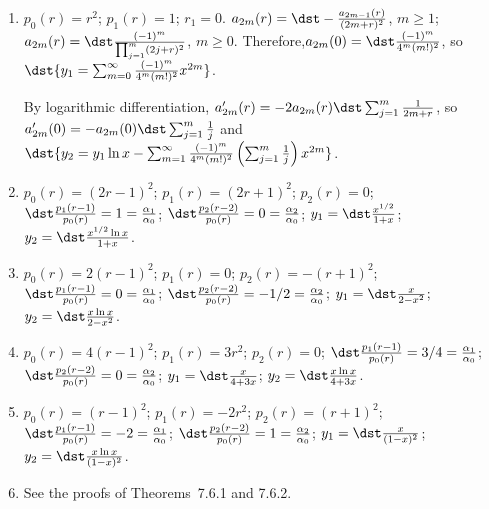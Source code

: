 \documentclass[openany]{book}
\newenvironment{sectionSolutions}{
 \begin{enumerate}[item-label={\thesection.\arabic{enumi}.}]
}{
 \end{enumerate}
}
\begin{document}
\begin{sectionSolutions}

\item
$p_0(r)=r^2$; $p_1(r)=1$; $r_1=0$.
$a_{2m}(r)=\dst-\frac{a_{2m-1}(r)}{(2m+r)^2}$, $m\ge1$;
$a_{2m}(r)=\dst\frac{(-1)^m}{\prod_{j=1}^m(2j+r)^2}$,  $m\ge0$.
Therefore,$a_{2m}(0)=\dst\frac{(-1)^m}{4^m(m!)^2}$, so
$\dst{y_1=\sum_{m=0}^\infty\frac{(-1)^m}{4^m(m!)^2}x^{2m}}$.

By logarithmic differentiation, $a_{2m}'(r)=-2a_{2m}(r)\dst
\sum_{j=1}^m\frac{1}{2m+r}$, so
 $a_{2m}'(0)=-a_{2m}(0)\dst\sum_{j=1}^m\frac{1}{ j}$ and
$\dst{y_2=y_1\ln x-
\sum_{m=1}^\infty\frac{(-1)^m}{4^m(m!)^2}
\left(\sum_{j=1}^m\frac{1}{ j}\right)x^{2m}}$.


\item
$p_0(r)=(2r-1)^2$;
$p_1(r)=(2r+1)^2$;
$p_2(r)=0$;
$\dst\frac{p_1(r-1)}{ p_0(r)}=1=\frac{\alpha_1}{\alpha_0}$;
$\dst\frac{p_2(r-2)}{ p_0(r)}=0=\frac{\alpha_2}{\alpha_0}$;
$y_1=\dst\frac{x^{1/2}}{1+x}$; $y_2=\dst\frac{x^{1/2}\ln x}{1+x}$.

\item
$p_0(r)=2(r-1)^2$;
$p_1(r)=0$;
$p_2(r)=-(r+1)^2$;
$\dst\frac{p_1(r-1)}{ p_0(r)}=0=\frac{\alpha_1}{\alpha_0}$;
$\dst\frac{p_2(r-2)}{ p_0(r)}=-1/2=\frac{\alpha_2}{\alpha_0}$;
$y_1=\dst\frac{x}{2-x^2}$; $y_2=\dst\frac{x\ln x}{2-x^2}$.


\item
$p_0(r)=4(r-1)^2$;
$p_1(r)=3r^2$;
$p_2(r)=0$;
$\dst\frac{p_1(r-1)}{ p_0(r)}=3/4=\frac{\alpha_1}{\alpha_0}$;
$\dst\frac{p_2(r-2)}{ p_0(r)}=0=\frac{\alpha_2}{\alpha_0}$;
$y_1=\dst\frac{x}{4+3x}$; $y_2=\dst\frac{x\ln x}{4+3x}$.

\item
$p_0(r)=(r-1)^2$;
$p_1(r)=-2r^2$;
$p_2(r)=(r+1)^2$;
$\dst\frac{p_1(r-1)}{ p_0(r)}=-2=\frac{\alpha_1}{\alpha_0}$;
$\dst\frac{p_2(r-2)}{ p_0(r)}=1=\frac{\alpha_2}{\alpha_0}$;
$y_1=\dst\frac{x}{(1-x)^2}$; $y_2=\dst\frac{x\ln x}{(1-x)^2}$.


\item
See the proofs of Theorems~7.6.1 and 7.6.2.
\end{sectionSolutions}
\end{document}
